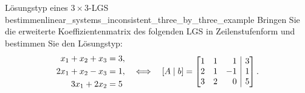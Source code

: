 \begin{ExampleBox}{Lösungstyp eines $3\times3$-LGS bestimmen}{linear_systems_inconsistent_three_by_three_example}
  Bringen Sie die erweiterte Koeffizientenmatrix des folgenden LGS in
  Zeilenstufenform und bestimmen Sie den Lösungstyp:
  \[
    \begin{aligned}
      x_1+x_2+x_3&=3,\\
      2x_1+x_2-x_3&=1,\\
      3x_1+2x_2&=5
    \end{aligned}
    \quad\Longleftrightarrow\quad
    [A\mid b]=
    \left[
      \begin{array}{@{}rrr|r@{}}
        1&1& 1&3\\
        2&1&-1&1\\
        3&2& 0&5
      \end{array}
    \right].
  \]


\end{ExampleBox}
